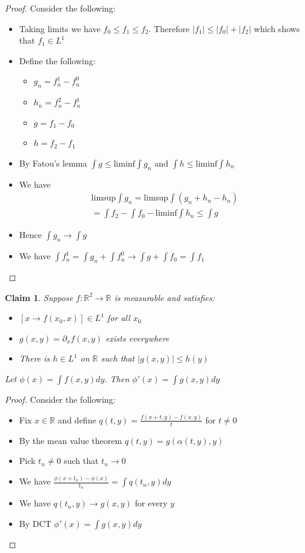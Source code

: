 \documentclass[a4paper,11pt]{article}
\newtheorem{claim}{Claim}
\begin{document}
\begin{proof}
  Consider the following:
  \begin{itemize}
    \item Taking limits we have $f_0 \leq f_1 \leq f_2$. Therefore $|f_1| \leq |f_0| + |f_2|$ which shows that $f_1 \in L^1$ 
    \item Define the following:
          \begin{itemize}
            \item $g_n=f_n^1-f_n^0$
            \item $h_n=f_n^2-f_n^1$
            \item $g=f_1-f_0$
            \item $h=f_2-f_1$
          \end{itemize}
    \item By Fatou's lemma $\int g \leq \text{liminf} \int g_n$ and $\int h \leq \text{liminf} \int h_n$
    \item We have \begin{align*}
                    \text{limsup} \int g_n = \text{limsup} \int (g_n +h_n -h_n) \\
                    = \int f_2 - \int f_0 - \text{liminf} \int h_n \leq \int g 
                  \end{align*}
    \item Hence $\int g_n \to \int g$
    \item We have $\int f_n^1 = \int g_n + \int f_n^0 \to \int g + \int f_0 = \int f_1$
  \end{itemize}
\end{proof}

\begin{claim}
  Suppose $f:\mathbb{R}^2 \to \mathbb{R}$ is measurable and satisfies:
  
  \begin{itemize}
    \item $[x \to f(x_0,x)] \in L^1$ for all $x_0$
    \item $g(x,y)=\partial_x f(x,y)$ exists everywhere
    \item There is $h \in L^1$ on $\mathbb{R}$ such that $|g(x,y)| \leq h(y)$ 
  \end{itemize}
  
  Let $\phi(x)= \int f(x,y)dy$. Then $\phi'(x)=\int g(x,y)dy$
\end{claim}

\begin{proof}
  Consider the following:
  \begin{itemize}
    \item Fix $x \in \mathbb{R}$ and define $q(t,y)=\frac{f(x+t,y)-f(x,y)}{t}$ for $t \neq 0$
    \item By the mean value theorem $q(t,y)=g(\alpha(t,y),y)$
    \item Pick $t_n \neq 0$ such that $t_n \to 0$
    \item We have $\frac{\phi(x+t_n)-\phi(x)}{t_n} = \int q(t_n,y)dy$
    \item We have $q(t_n,y) \to g(x,y)$ for every $y$
    \item By DCT $\phi'(x)= \int g(x,y)dy$
  \end{itemize}
\end{proof}
\end{document}
